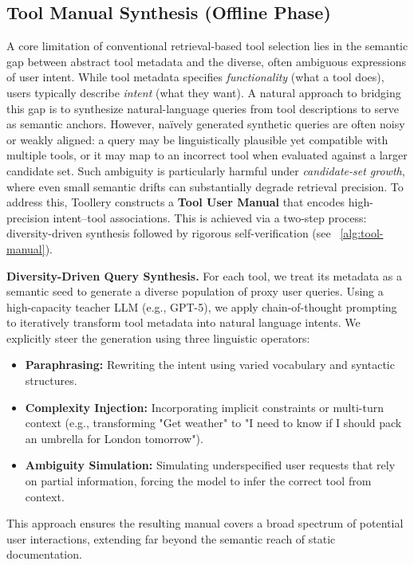 \documentclass[11pt]{article}
\begin{document}
\subsection{Tool Manual Synthesis (Offline Phase)}

A core limitation of conventional retrieval-based tool selection lies in the semantic gap between abstract tool metadata and the diverse, often ambiguous expressions of user intent. While tool metadata specifies \emph{functionality} (what a tool does), users typically describe \emph{intent} (what they want). A natural approach to bridging this gap is to synthesize natural-language queries from tool descriptions to serve as semantic anchors. However, naïvely generated synthetic queries are often noisy or weakly aligned: a query may be linguistically plausible yet compatible with multiple tools, or it may map to an incorrect tool when evaluated against a larger candidate set. Such ambiguity is particularly harmful under \emph{candidate-set growth}, where even small semantic drifts can substantially degrade retrieval precision. To address this, Toollery constructs a \textbf{Tool User Manual} that encodes high-precision intent--tool associations. This is achieved via a two-step process: diversity-driven synthesis followed by rigorous self-verification (see ~\ref{alg:tool-manual}).



\textbf{Diversity-Driven Query Synthesis.} For each tool, we treat its metadata as a semantic seed to generate a diverse population of proxy user queries. Using a high-capacity teacher LLM (e.g., GPT-5), we apply chain-of-thought prompting to iteratively transform tool metadata into natural language intents. We explicitly steer the generation using three linguistic operators:
\begin{itemize}
    \item \textbf{Paraphrasing:} Rewriting the intent using varied vocabulary and syntactic structures.
    \item \textbf{Complexity Injection:} Incorporating implicit constraints or multi-turn context (e.g., transforming "Get weather" to "I need to know if I should pack an umbrella for London tomorrow").
    \item \textbf{Ambiguity Simulation:} Simulating underspecified user requests that rely on partial information, forcing the model to infer the correct tool from context.
\end{itemize}
This approach ensures the resulting manual covers a broad spectrum of potential user interactions, extending far beyond the semantic reach of static documentation.
\end{document}
